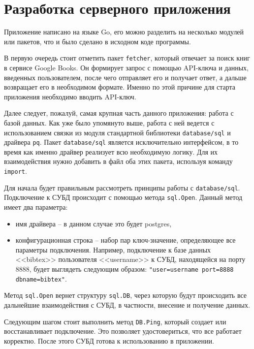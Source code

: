 \section*{Разработка серверного приложения}

Приложение написано на языке Go, его можно разделить на несколько модулей или пакетов, что и было сделано
в исходном коде программы. 

В первую очередь стоит отметить пакет \texttt{fetcher}, который отвечает за
поиск книг в сервисе Google Books. Он формирует запрос с помощью API-ключа и данных,
введенных пользователем, после чего отправляет его и получает ответ, а дальше возвращает его в необходимом
формате. Именно по этой причине для старта приложения необходимо вводить API-ключ.

Далее следует, пожалуй, самая крупная часть данного приложения: работа с базой данных. Как уже было упомянуто
выше, работа с ней ведется с использованием связки из модуля стандартной библиотеки \texttt{database/sql} и
драйвера \texttt{pq}. Пакет \texttt{database/sql} является исключительно интерфейсом, в то время как именно
драйвер реализует всю необходимую логику. Для их взаимодействия нужно добавить в файл оба этих пакета, используя команду
\texttt{import}.

Для начала будет правильным рассмотреть принципы работы с \texttt{database/sql}.
Подключение к СУБД происходит с помощью метода \texttt{sql.Open}.
Данный метод имеет два параметра:

\begin{itemize}
	\item имя драйвера -- в данном случае это будет postgres,
	\item конфигурационная строка -- набор пар ключ-значение, определяющее все параметры подключения. Например,
	      подключение к базе данных <<bibtex>> пользователя <<username>> к СУБД, находящейся на порту 8888, будет выглядеть
	      следующим образом: \texttt{"user=username port=8888 dbname=bibtex"}.
\end{itemize}

Метод \texttt{sql.Open} вернет структуру \texttt{sql.DB}, через которую будут происходить
все дальнейшие взаимодействия с СУБД, в частности, внесение и получение данных.

Следующим шагом стоит выполнить метод \texttt{DB.Ping}, который создает или восстанавливает подключение.
Это позволяет удостовериться, что все работает корректно. После этого СУБД готова к использованию в приложении.

